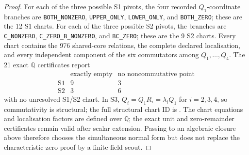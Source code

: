 \documentclass[11pt]{article}
\theoremstyle{definition}
\theoremstyle{remark}
\newcommand{\QQ}{\mathbb{Q}}
\begin{document}
\begin{proof}
For each of the three possible S1 pivots, the four recorded \(Q_1\)-coordinate
branches are \texttt{BOTH\_NONZERO}, \texttt{UPPER\_ONLY},
\texttt{LOWER\_ONLY}, and \texttt{BOTH\_ZERO}; these are the 12 S1 charts.
For each of the three possible S2 pivots, the branches are
\texttt{C\_NONZERO}, \texttt{C\_ZERO\_B\_NONZERO}, and
\texttt{BC\_ZERO}; these are the 9 S2 charts.  Every chart contains the 976
shared-core relations, the complete declared localisation, and every
independent component of the six commutators among \(Q_1,\ldots,Q_4\).
The 21 exact \(\QQ\) certificates report
\[
  \begin{array}{c|cc}
    &\text{exactly empty}&\text{no noncommutative point}\\ \hline
    \mathrm{S1}&9&3\\
    \mathrm{S2}&3&6
  \end{array}
\]
with no unresolved S1/S2 chart.  In S3,
\(Q_i=Q_1R_i=\lambda_iQ_1\) for \(i=2,3,4\), so commutativity is structural;
the full structural chart ID is
.
The chart equations and localisation factors are defined over \(\QQ\); the
exact unit and zero-remainder certificates remain valid after scalar
extension.  Passing to an algebraic closure above therefore chooses the
simultaneous normal form but does not replace the characteristic-zero proof
by a finite-field scout.


\end{proof}
\end{document}

